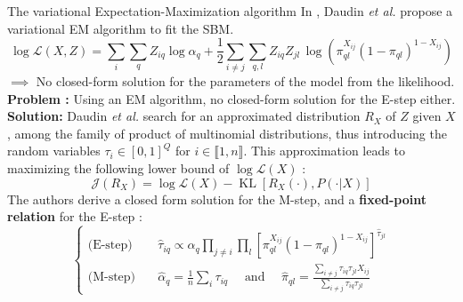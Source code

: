 \documentclass[final]{beamer}
\newlength{\colwidth}
\DeclareMathOperator*{\KL}{KL}
\begin{document}
\begin{frame}[t]
\begin{columns}[t]
\begin{column}{\colwidth}
      \begin{alertblock}{The variational Expectation-Maximization algorithm}
        In \cite{main_article}, Daudin \textit{et al.} propose a variational EM algorithm to fit the SBM.
        \begin{equation*}
          \log \mathcal{L}(X, Z) =  \sum_{i}\sum_{q} Z_{iq}\log\alpha_q + \frac{1}{2}\sum_{i\neq j}\sum_{q,l} Z_{iq}Z_{jl} \, \log\left( \pi_{ql}^{X_{ij}}\left(1-\pi_{ql}\right)^{1-X_{ij}} \right)
        \end{equation*}
        $\implies$ No closed-form solution for the parameters of the model from the likelihood.
        \newline
        \textbf{Problem :} Using an EM algorithm, no closed-form solution for the E-step either. %
        \newline
        \textbf{Solution:} Daudin \textit{et al.} search for an approximated distribution $R_X$ of $Z$ given $X$, among the family of product of multinomial distributions, thus introducing the random variables $\tau_i\in [0,1]^Q$ for $i\in \llbracket 1,n \rrbracket$. This approximation leads to maximizing the following lower bound of $\log \mathcal{L}(X)$ :
        \begin{equation*}
          \label{eq:lower_bound}
          \mathcal{J}(R_X)=\log \mathcal{L}(X)-\KL[R_X(\cdot), P(\cdot|X)]
        \end{equation*}
        The authors derive a closed form solution for the M-step, and a \textbf{fixed-point relation} for the E-step :
        \begin{equation*}
          \begin{cases}
            \text{(E-step)} \quad & \hat{\tau}_{iq}\propto \alpha_q \prod_{j\neq i}\prod_l \left[\pi_{ql}^{X_{ij}}(1-\pi_{ql})^{1-X_{ij}}\right]^{\hat{\tau}_{jl}}                                         \\
            \text{(M-step)} \quad & \hat{\alpha}_q=\frac{1}{n}\sum_{i} \tau_{iq} \quad \text{ and } \quad \hat{\pi}_{ql}=\frac{\sum_{i\neq j} \tau_{iq}\tau_{jl}X_{ij}}{\sum_{i\neq j} \tau_{iq}\tau_{jl}}
          \end{cases}
        \end{equation*}
        \centering
        \begin{minipage}{.9\linewidth}
          \begin{algorithm}[H]
            \caption{Variational Expectation-Maximization Algorithm}
            \label{alg:Daudin-EM}
            \begin{algorithmic}[1]

\end{algorithmic}
\end{algorithm}
\end{minipage}
\end{alertblock}
\end{column}
\end{columns}
\end{frame}
\end{document}
